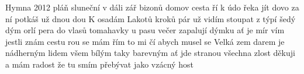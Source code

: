 \begin{TEXT}{Hymna 2012}
\SLOKA {} pláň\NL
sluneční v dáli zář\NL
bizonů domov   \NL
cesta ří k údo\NL
řeka jít dovo\NL
za ní potkáš už dnou dou 
\SLOKA K osadám\NL
Lakotů kroků pár\NL
už vidím stoupat z týpí šedý dým\NL
orlí pera do vlasů\NL
tomahavky u pasu\NL
večer zapalují dýmku ať je mír
\SLOKA[] vím jestli znám cestu\NL
{}rou se mám \NL
{}řím to mi čí\NL
abych musel se 
\SLOKA Velká zem\NL
darem je nádherným\NL
lidem všem bílým taky barevným\NL
ať jde stranou všechna zlost\NL
děkuji a mám radost\NL
že tu smím přebývat jako vzácný host
\end{TEXT}
